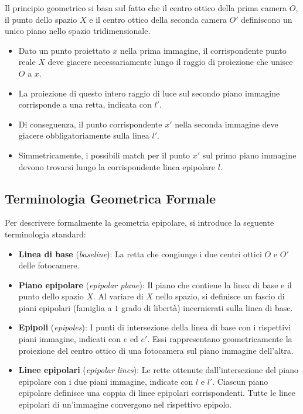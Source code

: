 ﻿\documentclass[11pt, a4paper]{article}
\begin{document}
Il principio geometrico si basa sul fatto che il centro ottico della prima camera $O$, il punto dello spazio $X$ e il centro ottico della seconda camera $O'$ definiscono un unico piano nello spazio tridimensionale.
\begin{itemize}[noitemsep]
    \item Dato un punto proiettato $x$ nella prima immagine, il corrispondente punto reale $X$ deve giacere necessariamente lungo il raggio di proiezione che unisce $O$ a $x$.
    \item La proiezione di questo intero raggio di luce sul secondo piano immagine corrisponde a una retta, indicata con $l'$.
    \item Di conseguenza, il punto corrispondente $x'$ nella seconda immagine deve giacere obbligatoriamente sulla linea $l'$.
    \item Simmetricamente, i possibili match per il punto $x'$ sul primo piano immagine devono trovarsi lungo la corrispondente linea epipolare $l$.
\end{itemize}



\subsection{Terminologia Geometrica Formale}

Per descrivere formalmente la geometria epipolare, si introduce la seguente terminologia standard:


\begin{itemize}[noitemsep]
    \item \textbf{Linea di base} (\emph{baseline}): La retta che congiunge i due centri ottici $O$ e $O'$ delle fotocamere.
    \item \textbf{Piano epipolare} (\emph{epipolar plane}): Il piano che contiene la linea di base e il punto dello spazio $X$. Al variare di $X$ nello spazio, si definisce un fascio di piani epipolari (famiglia a $1$ grado di libertà) incernierati sulla linea di base.
    \item \textbf{Epipoli} (\emph{epipoles}): I punti di intersezione della linea di base con i rispettivi piani immagine, indicati con $e$ ed $e'$. Essi rappresentano geometricamente la proiezione del centro ottico di una fotocamera sul piano immagine dell'altra.
    \item \textbf{Linee epipolari} (\emph{epipolar lines}): Le rette ottenute dall'intersezione del piano epipolare con i due piani immagine, indicate con $l$ e $l'$. Ciascun piano epipolare definisce una coppia di linee epipolari corrispondenti. Tutte le linee epipolari di un'immagine convergono nel rispettivo epipolo.
\end{itemize}
\end{document}
